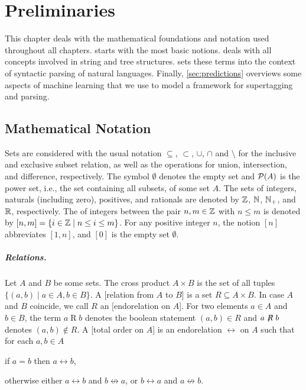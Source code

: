 \documentclass[../document.tex]{subfiles}
\begin{document}
    \chapter{Preliminaries}\label{sec:preliminaries}
    This chapter deals with the mathematical foundations and notation used throughout all chapters.
     starts with the most basic notions.
     deals with all concepts involved in string and tree structures.
     sets these terms into the context of syntactic parsing of natural languages.
    Finally, \cref{sec:predictions} overviews some aspects of machine learning that we use to model a framework for supertagging and parsing.

    \section{Mathematical Notation}\label{sec:preliminaries:math}
    Sets are considered with the usual notation \(\subseteq\), \(\subset\), \(\cup\), \(\cap\) and \(\setminus\) for the inclusive and exclusive subset relation, as well as the operations for union, intersection, and difference, respectively.
    The symbol \(\emptyset\) denotes the empty set and \(\mathcal{P}(A)\) is the power set, i.e., the set containing all subsets, of some set \(A\).
    The sets of integers, naturals (including zero), positives, and rationals are denoted by $\mathbb{Z}$, $\mathbb{N}$, $\mathbb{N}_+$, and $\mathbb{R}$, respectively.
    The  of integers between the pair \(n, m \in \mathbb{Z}\) with \(n \leq m\) is denoted by \([n,m] = \{i \in \mathbb{Z} \mid n \leq i \leq m\}\).
    For any positive integer \(n\), the notion \([n]\) abbreviates \([1,n]\), and \([0]\) is the empty set \(\emptyset\).

    \paragraph{Relations.}
    Let \(A\) and \(B\) be some sets.
    The cross product \(A \times B\) is the set of all tuples \(\{(a,b) \mid a \in A, b\in B\}\).
    A [relation from \(A\) to \(B\)] is a set \(R \subseteq A \times B\).
    In case \(A\) and \(B\) coincide, we call \(R\) an [endorelation on \(A\)].
    For two elements \(a \in A\) and \(b \in B\), the term \(a \mathrel{R} b\) denotes the boolean statement \((a,b) \in R\) and \(a \not\mathrel{R} b\) denotes \((a,b) \notin R\).
    A [total order on \(A\)] is an endorelation \(\rel\) on \(A\) such that for each \(a, b \in A\)
    \begin{inparaenum}
        \item if \(a = b\) then \(a \rel b\),
        \item otherwise either \(a \rel b\) and \(b \not\rel a\), or \(b \rel a\) and \(a \not\rel b\).
    \end{inparaenum}
\end{document}
